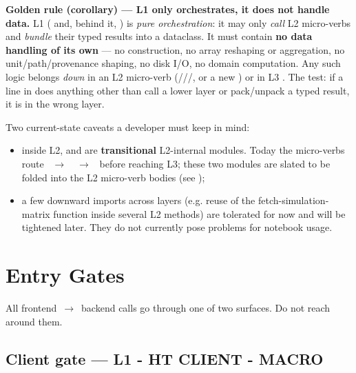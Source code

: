 \textbf{Golden rule (corollary) --- L1 only orchestrates, it does not handle data.} L1 ( and, behind it, ) is \emph{pure orchestration}: it may only \emph{call} L2 micro-verbs and \emph{bundle} their typed results into a  dataclass. It must contain \textbf{no data handling of its own} --- no  construction, no array reshaping or aggregation, no unit/path/provenance shaping, no disk I/O, no domain computation. Any such logic belongs \emph{down} in an L2 micro-verb (///, or a new ) or in L3 . The test: if a line in  does anything other than call a lower layer or pack/unpack a typed result, it is in the wrong layer.


\noindent Two current-state caveats a developer must keep in mind:
\begin{itemize}
    \item inside L2,  and  are \textbf{transitional} L2-internal modules. Today the micro-verbs route ~$\rightarrow$~~$\rightarrow$~ before reaching L3; these two modules are slated to be folded into the L2 micro-verb bodies (see );
    \item a few downward imports across layers (e.g. reuse of the fetch-simulation-matrix function inside several L2 methods) are tolerated for now and will be tightened later. They do not currently pose problems for notebook usage.
\end{itemize}

\section{Entry Gates}
\label{sec-dev-gates}

All frontend~$\rightarrow$~backend calls go through one of two surfaces. Do not reach around them.

\subsection{Client gate --- L1 - HT CLIENT - MACRO}

